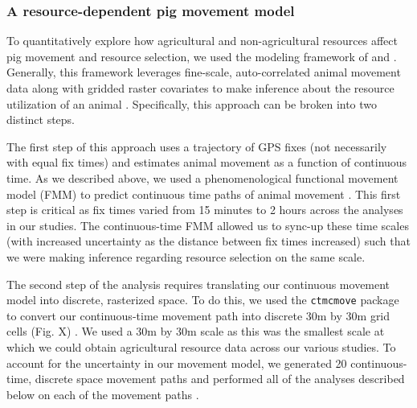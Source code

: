 \documentclass[a4paper]{article}
\begin{document}



\subsubsection*{A resource-dependent pig movement model}

To quantitatively explore how agricultural and non-agricultural resources affect pig movement and resource selection, we used the modeling framework of \cite{Hanks2015} and \cite{Wilson2018}.  Generally, this framework leverages fine-scale, auto-correlated animal movement data along with gridded raster covariates to make inference about the resource utilization of an animal \citep{Hanks2015,Buderman2018,Wilson2018}.  Specifically, this approach can be broken into two distinct steps. 

The first step of this approach uses a trajectory of GPS fixes (not necessarily with equal fix times) and estimates animal movement as a function of continuous time.  As we described above, we used a phenomenological functional movement model (FMM) to predict continuous time paths of animal movement \citep{Buderman2016,Hooten2017a}.  This first step is critical as fix times varied from 15 minutes to 2 hours across the analyses in our studies. The continuous-time FMM allowed us to sync-up these time scales (with increased uncertainty as the distance between fix times increased) such that we were making inference regarding resource selection on the same scale.

The second step of the analysis requires translating our continuous movement model into discrete, rasterized space.  To do this, we used the \texttt{ctmcmove} package to convert our continuous-time movement path into discrete 30m by 30m grid cells (Fig. X) \citep{Wilson2018}. We used a 30m by 30m scale as this was the smallest scale at which we could obtain agricultural resource data across our various studies. To account for the uncertainty in our movement model, we generated 20 continuous-time, discrete space movement paths and performed all of the analyses described below on each of the movement paths \citep{Hanks2015,Buderman2018}.
\end{document}
